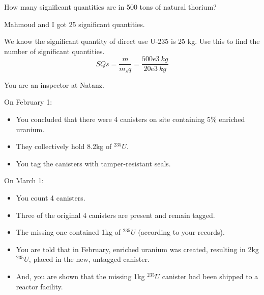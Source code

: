 \documentclass[11pt,answers,addpoints]{exam}
\begin{document}
\begin{questions}
        \question[10] How many significant quantities are in 500 tons of natural 
        thorium?

        \begin{solution}
        Mahmoud and I got 25 significant quantities.

        We know the significant quantity of direct use U-235 is 25 kg. Use this to find the number of significant quantities.
        \begin{equation}
            SQs = \frac{m}{m_sq} = \frac{500e3 \ kg}{20e3 \ kg}
        \end{equation}
        \end{solution}

        \question You are an inspector at Natanz.

        On February 1: 
        \begin{itemize}
        \item You concluded that there were 4 canisters on site containing 5\% 
                enriched uranium.
        \item They collectively hold 8.2kg of $^{235}U$.
        \item You tag the canisters with tamper-resistant seals.
        \end{itemize}

        On March 1:
        \begin{itemize}
        \item You count 4 canisters. 
        \item Three of the original 4 canisters are present and remain tagged. 
        \item The missing one contained 1kg of $^{235}U$ (according to your records).
        \item You are told that in February,  enriched uranium was created, 
                resulting in 2kg $^{235}U$, placed in the new, untagged canister.
        \item And, you are shown that the missing 1kg $^{235}U$ canister had been shipped to a reactor facility. 
        \end{itemize}
\end{questions}
\end{document}
